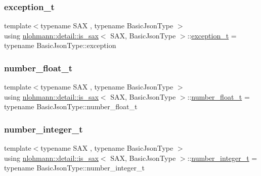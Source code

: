 \subsubsection{\texorpdfstring{exception\_t}{exception\_t}}
{\footnotesize\ttfamily template$<$typename S\+AX , typename Basic\+Json\+Type $>$ \\
using \mbox{\hyperlink{structnlohmann_1_1detail_1_1is__sax}{nlohmann\+::detail\+::is\+\_\+sax}}$<$ S\+AX, Basic\+Json\+Type $>$\+::\mbox{\hyperlink{structnlohmann_1_1detail_1_1is__sax_a6efa516f35d544cc8ce9a954f849fed1}{exception\+\_\+t}} =  typename Basic\+Json\+Type\+::exception\hspace{0.3cm}{\ttfamily [private]}}

\mbox{\label{structnlohmann_1_1detail_1_1is__sax_a58d3205c8d3c7a01cc330374fa7976c5}} 
\subsubsection{\texorpdfstring{number\_float\_t}{number\_float\_t}}
{\footnotesize\ttfamily template$<$typename S\+AX , typename Basic\+Json\+Type $>$ \\
using \mbox{\hyperlink{structnlohmann_1_1detail_1_1is__sax}{nlohmann\+::detail\+::is\+\_\+sax}}$<$ S\+AX, Basic\+Json\+Type $>$\+::\mbox{\hyperlink{structnlohmann_1_1detail_1_1is__sax_a58d3205c8d3c7a01cc330374fa7976c5}{number\+\_\+float\+\_\+t}} =  typename Basic\+Json\+Type\+::number\+\_\+float\+\_\+t\hspace{0.3cm}{\ttfamily [private]}}

\mbox{\label{structnlohmann_1_1detail_1_1is__sax_aa9a29390ca9810cee149510f586f5573}} 
\subsubsection{\texorpdfstring{number\_integer\_t}{number\_integer\_t}}
{\footnotesize\ttfamily template$<$typename S\+AX , typename Basic\+Json\+Type $>$ \\
using \mbox{\hyperlink{structnlohmann_1_1detail_1_1is__sax}{nlohmann\+::detail\+::is\+\_\+sax}}$<$ S\+AX, Basic\+Json\+Type $>$\+::\mbox{\hyperlink{structnlohmann_1_1detail_1_1is__sax_aa9a29390ca9810cee149510f586f5573}{number\+\_\+integer\+\_\+t}} =  typename Basic\+Json\+Type\+::number\+\_\+integer\+\_\+t\hspace{0.3cm}{\ttfamily [private]}}

